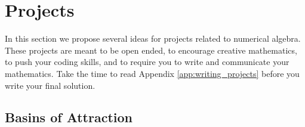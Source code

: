 % 


\newpage\section{Projects}
In this section we propose several ideas for projects related to numerical algebra.  These
projects are meant to be open ended, to encourage creative mathematics, to push your
coding skills, and to require you to write and communicate your mathematics.  Take the
time to read Appendix \ref{app:writing_projects} before you write your final solution.

\subsection{Basins of Attraction}

